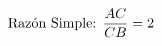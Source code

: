 \documentclass[preview]{standalone}
\begin{document}
\begin{align*}
\special{dvisvgm:raw <g id='unique000'>}\text{Razón Simple: } \frac{AC}{CB} = 2\special{dvisvgm:raw </g>}
\end{align*}
\end{document}
